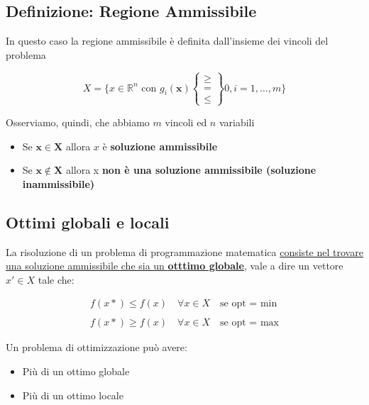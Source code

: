         \subsection{Definizione: Regione Ammissibile}
        In questo caso la regione ammissibile è definita dall'insieme dei vincoli del problema

        {
            \large

            $$
                X = \{x \in \mathbb{R}^n \text{ con } 
                g_i(\mathbf{x}) 
                \begin{Bmatrix} 
                    \ge \\ = \\ \le 
                \end{Bmatrix} 0, i=1,\dots,m
                    \}
            $$
        }
        
        Osserviamo, quindi, che abbiamo $m$ vincoli ed $n$ variabili
        \begin{itemize}
            \item Se $\mathbf{x \in X}$ allora $x$ è \textbf{soluzione ammissibile}
            \item Se $\mathbf{x \not\in X}$ allora x \textbf{non è una soluzione ammissibile (soluzione inammissibile)}
        \end{itemize}

        \subsection{Ottimi globali e locali}
        La risoluzione di un problema di programmazione matematica \uline{consiste nel trovare una soluzione ammissibile che sia un \textbf{otttimo globale}}, vale a dire un vettore $x' \in X$ tale che:
        
        \begin{gather*}
            f(x*) \leq f(x) \quad \forall x \in X \quad \text{se opt = min} \\ \\
            f(x*) \geq f(x) \quad \forall x \in X \quad \text{se opt = max}
        \end{gather*}

        Un problema di ottimizzazione può avere:
        \begin{itemize}
            \item Più di un ottimo globale
            \item Più di un ottimo locale
        \end{itemize}

